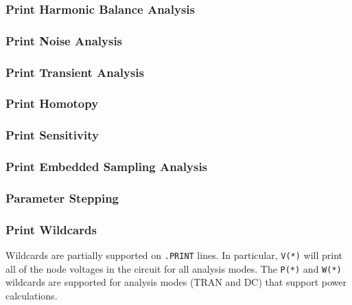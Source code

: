 \subsubsection{Print Harmonic Balance Analysis}


\subsubsection{Print Noise Analysis}


\subsubsection{Print Transient Analysis}


\subsubsection{Print Homotopy}
\label{Print_Homotopy}


\subsubsection{Print Sensitivity}
\label{Print_Sensitivity}


\subsubsection{Print Embedded Sampling Analysis}


\subsubsection{Parameter Stepping}
\label{Print_Step}


\subsubsection{Print Wildcards}
\label{Print_Wildcards}
Wildcards are partially supported on \texttt{.PRINT} lines. In particular,
\texttt{V(*)} will print all of the node voltages in the circuit for all
analysis modes.  The \texttt{P(*)}  and \texttt{W(*)} wildcards are supported
for analysis modes (TRAN and DC) that support power calculations.

